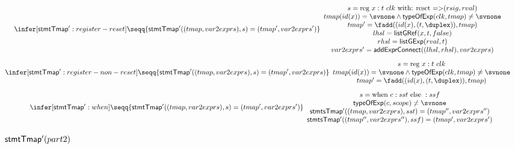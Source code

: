 {\begin{figure}[htbp]
  \small
   \begin{gather*}
    \infer[{\sf stmtTmap'}: register-reset]
    {\seqq{{\sf stmtTmap'}((tmap, var2exprs), s) = (tmap', var2exprs')}}
    {
    \begin{array}{c} 
      s = \mbox{reg } x: t \ clk \mbox{ with: reset =>} (rsig, rval)  \\
      tmap(id(x)) = \svnone \wedge {\sf typeOfExp}(clk, tmap) \neq \svnone  \\
      tmap' = \fadd((id(x), (t, \duplex)), tmap) \\
      lhsl = {\sf listGRef} (x, t, false) \\
      rhsl = {\sf listGExp} (rval, t)\\
      var2exprs' = {\sf addExprConnect} ((lhsl, rhsl), var2exprs )
     \end{array}
    }
   \quad
   \\[1ex]
    \infer[{\sf stmtTmap'}: register-non-reset]
    {\seqq{{\sf stmtTmap'}((tmap, var2exprs), s) = (tmap', var2exprs)}}
    {
    \begin{array}{c}
      s = \mbox{reg } x: t \ clk \\
      tmap(id(x)) = \svnone \wedge {\sf typeOfExp}(clk, tmap) \neq \svnone  \\
      tmap' = \fadd((id(x), (t, \duplex)), tmap) 
     \end{array}
    }
   \quad
   \\[1ex]
   \infer[{\sf stmtTmap'}: when]
    {\seqq{{\sf stmtTmap'}((tmap, var2exprs), s) = (tmap', var2exprs')}}
    {
    \begin{array}{c}
      s = \mbox{when } c: sst \mbox{ else }: ssf  \\
      {\sf typeOfExp}(c, scope) \neq \svnone \\
      {\sf stmtsTmap'}((tmap, var2exprs), sst) = (tmap'', var2exprs'') \\
      {\sf stmtsTmap'}((tmap'', var2exprs''), ssf) = (tmap', var2exprs')
     \end{array}
    }
    \end{gather*}
  \caption{${\sf stmtTmap'} (part 2)$}
  \label{tab:stmts-tmap-2}
\end{figure}

}
